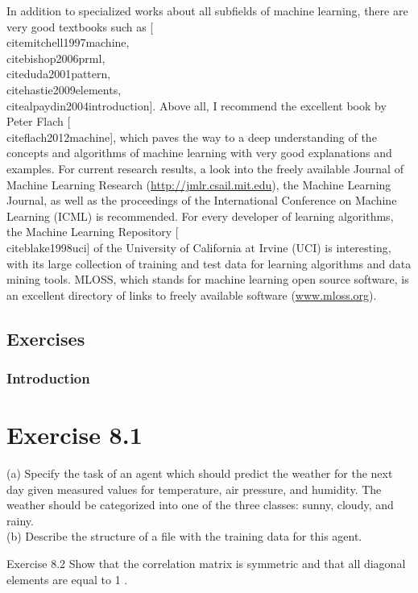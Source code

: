 \documentclass[10pt]{book}
\begin{document}
In addition to specialized works about all subfields of machine learning, there are very good textbooks such as [\\cite{mitchell1997machine}, \\cite{bishop2006prml}, \\cite{duda2001pattern}, \\cite{hastie2009elements}, \\cite{alpaydin2004introduction}]. Above all, I recommend the excellent book by Peter Flach [\\cite{flach2012machine}], which paves the way to a deep understanding of the concepts and algorithms of machine learning with very good explanations and examples. For current research results, a look into the freely available Journal of Machine Learning Research (\href{http://jmlr.csail.mit.edu}{http://jmlr.csail.mit.edu}), the Machine Learning Journal, as well as the proceedings of the International Conference on Machine Learning (ICML) is recommended. For every developer of learning algorithms, the Machine Learning Repository [\\cite{blake1998uci}] of the University of California at Irvine (UCI) is interesting, with its large collection of training and test data for learning algorithms and data mining tools. MLOSS, which stands for machine learning open source software, is an excellent directory of links to freely available software (\href{http://www.mloss.org}{www.mloss.org}).

\subsection*{Exercises}
\subsubsection*{Introduction}
\section*{Exercise 8.1}
(a) Specify the task of an agent which should predict the weather for the next day given measured values for temperature, air pressure, and humidity. The weather should be categorized into one of the three classes: sunny, cloudy, and rainy.\\
(b) Describe the structure of a file with the training data for this agent.

Exercise 8.2 Show that the correlation matrix is symmetric and that all diagonal elements are equal to 1 .
\end{document}
